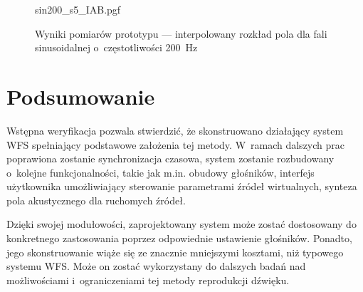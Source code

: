 \documentclass[10pt, a4paper]{article}
\let\Oldsection\section
\renewcommand{\section}{\FloatBarrier\Oldsection}
\begin{document}
\begin{figure}[!tbh]
    \centering
    {sin200_s5_IAB.pgf}
    \caption{Wyniki pomiarów prototypu --- interpolowany rozkład pola dla fali sinusoidalnej o~częstotliwości \SI{200}{\hertz}}
  \label{r:pomiar_kb}
\end{figure}

\section{Podsumowanie}

Wstępna weryfikacja pozwala stwierdzić, że
skonstruowano działający system WFS spełniający podstawowe założenia tej metody.
W~ramach dalszych prac poprawiona zostanie synchronizacja czasowa,
system zostanie rozbudowany o~kolejne funkcjonalności,
takie jak m.in. obudowy głośników, interfejs użytkownika umożliwiający sterowanie
parametrami źródeł wirtualnych, synteza pola akustycznego dla ruchomych źródeł.

Dzięki swojej modułowości, zaprojektowany system może zostać dostosowany do
konkretnego zastosowania poprzez odpowiednie ustawienie głośników. Ponadto,
jego skonstruowanie wiąże się ze znacznie mniejszymi kosztami, niż typowego
systemu WFS. Może on zostać wykorzystany do dalszych badań nad możliwościami
i~ograniczeniami tej metody reprodukcji dźwięku.


\printbibliography
\end{document}
